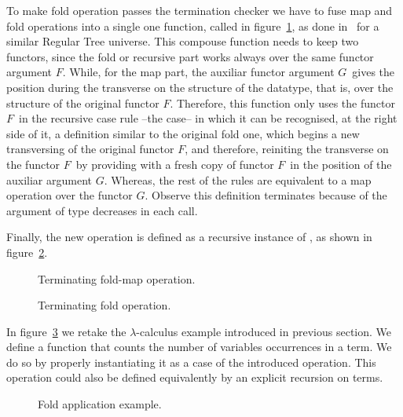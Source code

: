 \documentclass{book}
\begin{document}
To make fold operation passes the termination checker we have to fuse map and fold operations into a single one function, called  in figure~\ref{fig:foldt}, as done in~\cite{Norell2009} for a similar Regular Tree universe.  This compouse function needs to keep two functors, since the fold or recursive part works always over the same functor argument $F$. While, for the map part, the auxiliar functor argument $G$\ gives the position during the transverse on the structure of the datatype, that is, over the structure of the original functor $F$. Therefore, this function only uses the functor $F$\ in the recursive case rule --the  case-- in which it can be recognised, at the right side of it, a definition similar to the original fold one, which begins a new transversing of the original functor $F$, and therefore, reiniting the transverse on the functor $F$\ by providing with a fresh copy of functor $F$\ in the position of the auxiliar argument $G$. Whereas, the rest of the rules are equivalent to a map operation over the functor $G$. Observe this definition terminates because of the argument of type  decreases in each call. 

Finally, the new  operation is defined as a recursive instance of , as shown in figure~\ref{fig:foldt2}. 



\begin{figure}[h]
  \caption{Terminating fold-map operation.}
\label{fig:foldt}
\end{figure}

\begin{figure}[h]
  \caption{Terminating fold operation.}
\label{fig:foldt2}
\end{figure}


In figure~\ref{fig:vars} we retake the $\lambda$-calculus example introduced in previous section. We define a function  that counts the number of variables occurrences in a term. We do so by properly instantiating it as a case of the introduced  operation. This operation could also be defined equivalently by an explicit recursion on terms.

\begin{figure}[h]
    \caption{Fold application example.}
\label{fig:vars}
\end{figure}
\end{document}
